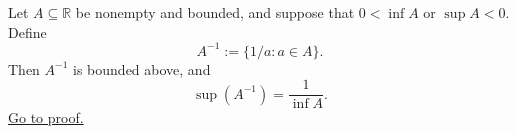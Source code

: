 \begin{theorem}
\label{thm:supremum-reciprocal-set}
Let $A\subseteq\mathbb{R}$ be nonempty and bounded, and suppose that
$0<\inf A$ or $\sup A<0$.  Define
\[
  A^{-1}:=\{1/a:a\in A\}.
\]
Then $A^{-1}$ is bounded above, and
\[
  \sup(A^{-1})=\frac{1}{\inf A}.
\]
\hyperref[prf:supremum-reciprocal-set]{Go to proof.}
\end{theorem}